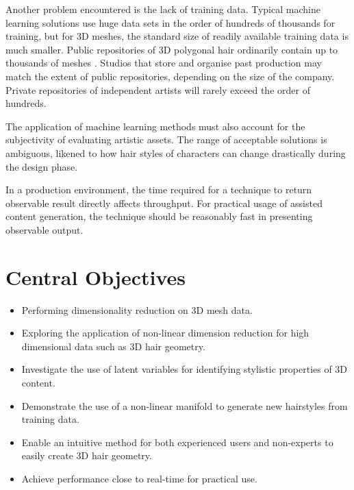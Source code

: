 \documentclass[ %
author={Dillon Keith Diep},
supervisor={Dr. Carl Henrik Ek},
degree={MEng},
title={ART-CG Hair:},
subtitle={Assisted Real-time Content Generation of Stylised Virtual Hair},
type={Research},
year={2017} ]{dissertation}
\begin{document}
Another problem encountered is the lack of training data. Typical machine learning solutions use huge data sets in the order of hundreds of thousands for training, but for 3D meshes, the standard size of readily available training data is much smaller. Public repositories of 3D polygonal hair ordinarily contain up to thousands of meshes \cite{tsr}. Studios that store and organise past production may match the extent of public repositories, depending on the size of the company. Private repositories of independent artists will rarely exceed the order of hundreds.

The application of machine learning methods must also account for the subjectivity of evaluating artistic assets. The range of acceptable solutions is ambiguous, likened to how hair styles of characters can change drastically during the design phase.

In a production environment, the time required for a technique to return observable result directly affects throughput. For practical usage of assisted content generation, the technique should be reasonably fast in presenting observable output.

\section{Central Objectives}
\label{chap:context:objectives}
\begin{itemize}
	\item Performing dimensionality reduction on 3D mesh data.
	\item Exploring the application of non-linear dimension reduction for high dimensional data such as 3D hair geometry.
	\item Investigate the use of latent variables for identifying stylistic properties of 3D content.
	\item Demonstrate the use of a non-linear manifold to generate new hairstyles from training data.
	\item Enable an intuitive method for both experienced users and non-experts to easily create 3D hair geometry.
	\item Achieve performance close to real-time for practical use.
\end{itemize}

\end{document}

